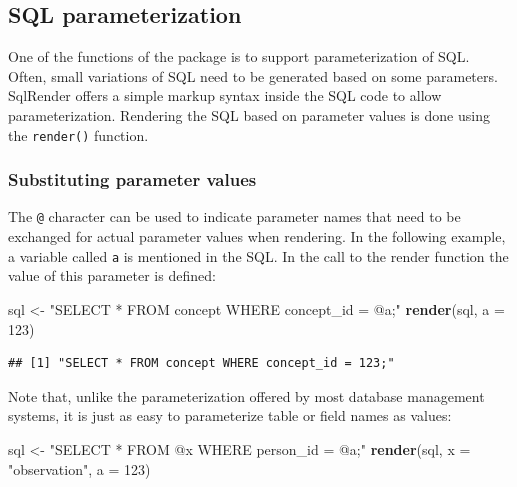 \documentclass[11pt]{book}
\newenvironment{Shaded}{\begin{snugshade}}{\end{snugshade}}
\newcommand{\DataTypeTok}[1]{\textcolor[rgb]{0.13,0.29,0.53}{#1}}
\newcommand{\DecValTok}[1]{\textcolor[rgb]{0.00,0.00,0.81}{#1}}
\newcommand{\KeywordTok}[1]{\textcolor[rgb]{0.13,0.29,0.53}{\textbf{#1}}}
\newcommand{\NormalTok}[1]{#1}
\newcommand{\StringTok}[1]{\textcolor[rgb]{0.31,0.60,0.02}{#1}}
\theoremstyle{definition}
\theoremstyle{definition}
\theoremstyle{definition}
\theoremstyle{remark}
\begin{document}
\hypertarget{sql-parameterization}{%
\subsection{SQL parameterization}\label{sql-parameterization}}

One of the functions of the package is to support parameterization of SQL. Often, small variations of SQL need to be generated based on some parameters. SqlRender offers a simple markup syntax inside the SQL code to allow parameterization. Rendering the SQL based on parameter values is done using the \texttt{render()} function. 

\hypertarget{substituting-parameter-values}{%
\subsubsection*{Substituting parameter values}\label{substituting-parameter-values}}

The \texttt{@} character can be used to indicate parameter names that need to be exchanged for actual parameter values when rendering. In the following example, a variable called \texttt{a} is mentioned in the SQL. In the call to the render function the value of this parameter is defined:

\begin{Shaded}
\begin{Highlighting}[]
\NormalTok{sql <-}\StringTok{ "SELECT * FROM concept WHERE concept_id = @a;"}
\KeywordTok{render}\NormalTok{(sql, }\DataTypeTok{a =} \DecValTok{123}\NormalTok{)}
\end{Highlighting}
\end{Shaded}

\begin{verbatim}
## [1] "SELECT * FROM concept WHERE concept_id = 123;"
\end{verbatim}

Note that, unlike the parameterization offered by most database management systems, it is just as easy to parameterize table or field names as values:

\begin{Shaded}
\begin{Highlighting}[]
\NormalTok{sql <-}\StringTok{ "SELECT * FROM @x WHERE person_id = @a;"}
\KeywordTok{render}\NormalTok{(sql, }\DataTypeTok{x =} \StringTok{"observation"}\NormalTok{, }\DataTypeTok{a =} \DecValTok{123}\NormalTok{)}
\end{Highlighting}
\end{Shaded}
\end{document}
